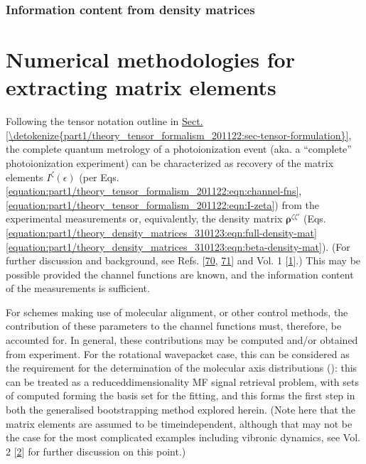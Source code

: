 \documentclass[letterpaper,table,10pt,english]{jupyterBook}
\begin{document}
\subsection{Information content from density matrices}
\label{\detokenize{part1/theory_info_content_221122:information-content-from-density-matrices}}
\sphinxstepscope


\chapter{Numerical methodologies for extracting matrix elements}
\label{\detokenize{part1/numerics_231122:numerical-methodologies-for-extracting-matrix-elements}}\label{\detokenize{part1/numerics_231122:chpt-numerical-details}}\label{\detokenize{part1/numerics_231122::doc}}
\sphinxAtStartPar
Following the tensor notation outline in \hyperref[\detokenize{part1/theory_tensor_formalism_201122:sec-tensor-formulation}]{Sect.\@ \ref{\detokenize{part1/theory_tensor_formalism_201122:sec-tensor-formulation}}}, the complete quantum metrology of a photoionization event (aka. a “complete” photoionization experiment) can be characterized as recovery of the matrix elements \(I^{\zeta}(\epsilon)\) (per Eqs. \eqref{equation:part1/theory_tensor_formalism_201122:eqn:channel-fns}, \eqref{equation:part1/theory_tensor_formalism_201122:eqn:I-zeta}) from the experimental measurements or, equivalently, the density matrix \(\mathbf{\rho}^{\zeta\zeta'}\) (Eqs. \eqref{equation:part1/theory_density_matrices_310123:eqn:full-density-mat} \sphinxhyphen{} \eqref{equation:part1/theory_density_matrices_310123:eqn:beta-density-mat}). (For further discussion and background, see Refs. {[}\hyperlink{cite.backmatter/bibliography:id755}{70}, \hyperlink{cite.backmatter/bibliography:id655}{71}{]} and  Vol. 1 {[}\hyperlink{cite.backmatter/bibliography:id613}{1}{]}.) This may be possible provided the channel functions are known, and the information content of the measurements is sufficient.

\sphinxAtStartPar
For schemes making use of molecular alignment, or other control methods, the contribution of these parameters to the channel functions must, therefore, be accounted for. In general, these contributions may be computed and/or obtained from experiment. For the rotational wavepacket case, this can be considered as the requirement for the determination of the molecular axis distributions ({\hyperref[\detokenize{backmatter/glossary:term-ADMs}]{}}): this can be treated as a reduced\sphinxhyphen{}dimensionality MF signal retrieval problem, with sets of computed {\hyperref[\detokenize{backmatter/glossary:term-ADMs}]{}} forming the basis set for the fitting, and this forms the first step in both the generalised bootstrapping method explored herein. (Note here that the matrix elements are assumed to be time\sphinxhyphen{}independent, although that may not be the case for the most complicated examples including vibronic dynamics, see  Vol. 2 {[}\hyperlink{cite.backmatter/bibliography:id614}{2}{]} for further discussion on this point.)
\end{document}
